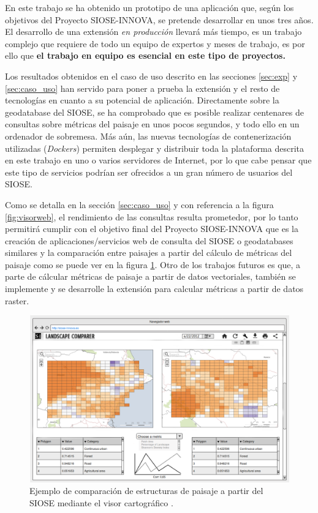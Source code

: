 En este trabajo se ha obtenido un prototipo de una aplicación que, según los objetivos del Proyecto SIOSE-INNOVA, se pretende desarrollar en unos tres años. El desarrollo de una extensión \textit{en producción} llevará más tiempo, es un trabajo complejo que requiere de todo un equipo de expertos y meses de trabajo, es por ello que \textbf{el trabajo en equipo es esencial en este tipo de proyectos.}

Los resultados obtenidos en el caso de uso descrito en las secciones \ref{sec:exp} y \ref{sec:caso_uso} han servido para poner a prueba la extensión y el resto de tecnologías en cuanto a su potencial de aplicación. Directamente sobre la geodatabase del SIOSE, se ha comprobado que es posible realizar centenares de consultas sobre métricas del paisaje en unos pocos segundos, y todo ello en un ordenador de sobremesa. Más aún, las nuevas tecnologías de contenerización utilizadas (\textit{Dockers}) permiten desplegar y distribuir toda la plataforma descrita en este trabajo en uno o varios servidores de Internet, por lo que cabe pensar que este tipo de servicios podrían ser ofrecidos a un gran número de usuarios del SIOSE.

Como se detalla en la sección \ref{sec:caso_uso} y con referencia a la figura \ref{fig:visorweb}, el rendimiento de las consultas resulta prometedor, por lo tanto permitirá cumplir con el objetivo final del Proyecto SIOSE-INNOVA que es la creación de aplicaciones/servicios web de consulta del SIOSE o geodatabases similares y la comparación entre paisajes a partir del cálculo de métricas del paisaje como se puede ver en la figura \ref{fig:visor-final}. Otro de los trabajos futuros es que, a parte de cálcular métricas de paisaje a partir de datos vectoriales, también se implemente y se desarrolle la extensión \pgland{} para calcular métricas a partir de datos raster.

\begin{figure}
\begin{center}
\includegraphics[width=\textwidth]{ConclusionyFuturo/Figs/visor-final.png}
\caption{Ejemplo de comparación de estructuras de paisaje a partir del SIOSE mediante el visor cartográfico . \label{fig:visor-final}}
\end{center}
\end{figure}

